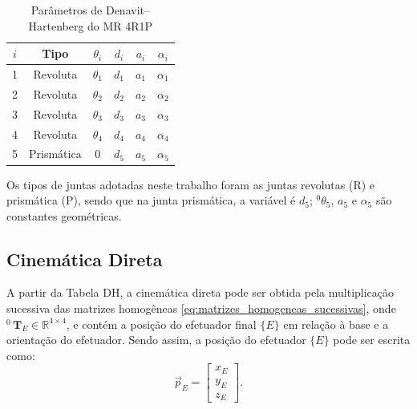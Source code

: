 \begin{table}[ht]
\centering
\caption{Parâmetros de Denavit--Hartenberg do MR 4R1P}
\begin{tabular}{c c c c c c}
\hline
$i$ & Tipo & $\theta_i$ & $d_i$ & $a_i$ & $\alpha_i$ \\
\hline
1 & Revoluta & $\theta_1$ & $d_1$ & $a_1$ & $\alpha_1$ \\
2 & Revoluta & $\theta_2$ & $d_2$ & $a_2$ & $\alpha_2$ \\
3 & Revoluta & $\theta_3$ & $d_3$ & $a_3$ & $\alpha_3$ \\
4 & Revoluta & $\theta_4$ & $d_4$ & $a_4$ & $\alpha_4$ \\
5 & Prismática & $0$      & $d_5$ & $a_5$ & $\alpha_5$ \\
\hline
\end{tabular}
\label{tab:DH-MR}
\end{table}
Os tipos de juntas adotadas neste trabalho foram as juntas revolutas (R) e prismática (P), sendo que na junta prismática, a variável é $d_5$; ${}^0 \theta_5$, $a_5$ e $\alpha_5$ são constantes geométricas.

\subsection{Cinemática Direta}

A partir da Tabela DH, a cinemática direta pode ser obtida pela multiplicação sucessiva das matrizes homogêneas
\eqref{eq:matrizes_homogeneas_sucessivas},
onde ${}^0\,\mathbf{T}_{E} \in \mathbb{R}^{4 \times 4}$,
e contém a posição do efetuador final $\{E\}$ em relação à base e a orientação do efetuador.
Sendo assim, a posição do efetuador $\{E\}$ pode ser escrita como:
\begin{equation}
\vec{p}_E = 
\begin{bmatrix}
x_E \\ y_E \\ z_E
\end{bmatrix}.
\end{equation}

